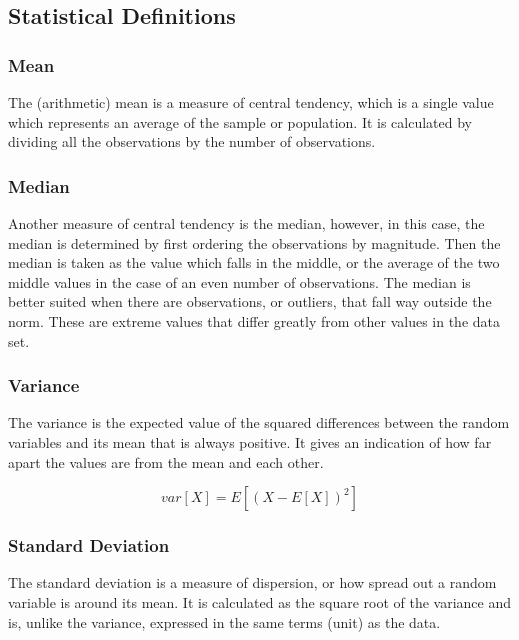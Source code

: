 \documentclass[11pt,]{article}
\begin{document}
\subsection{Statistical Definitions}\label{statistical-definitions}

\subsubsection{Mean}\label{mean}

The (arithmetic) mean is a measure of central tendency, which is a
single value which represents an average of the sample or population. It
is calculated by dividing all the observations by the number of
observations.

\subsubsection{Median}\label{median}

Another measure of central tendency is the median, however, in this
case, the median is determined by first ordering the observations by
magnitude. Then the median is taken as the value which falls in the
middle, or the average of the two middle values in the case of an even
number of observations. The median is better suited when there are
observations, or outliers, that fall way outside the norm. These are
extreme values that differ greatly from other values in the data set.

\subsubsection{Variance}\label{variance}

The variance is the expected value of the squared differences between
the random variables and its mean that is always positive. It gives an
indication of how far apart the values are from the mean and each other.

\[ var[X] = E[(X - E[X])^2] \]

\subsubsection{Standard Deviation}\label{standard-deviation}

The standard deviation is a measure of dispersion, or how spread out a
random variable is around its mean. It is calculated as the square root
of the variance and is, unlike the variance, expressed in the same terms
(unit) as the data.
\end{document}
